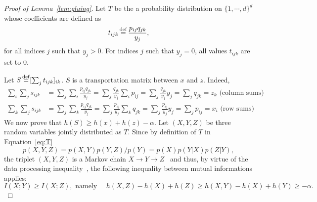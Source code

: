 \documentclass{amsart} %
\begin{document}
\begin{proof}[Proof of Lemma~\ref{lem:gluing}]
	Let $T$ be the a probability distribution on $\{1,\cdots,d\}^d$ whose coefficients are defined as 
\begin{equation}\label{eq:T}t_{ijk}\operatorname{\overset{\operatorname{def}}{=}} \frac{p_{ij}q_{jk}}{y_j},\end{equation}
	for all indices $j$ such that $y_j>0$. For indices $j$ such that $y_j=0$, all values $t_{ijk}$ are set to $0$.

Let	$S \operatorname{\overset{\operatorname{def}}{=}} [ \sum_{j} t_{ijk}]_{ik}$. $S$ is a transportation matrix between $x$ and $z$. Indeed, 
	$$\begin{aligned}
	\sum_{i} \sum_{j} s_{ijk}&= \sum_{j} \sum_{i}\frac{p_{ij}q_{jk}}{y_j}= \sum_{j} \frac{q_{jk}}{y_j} \sum_{i} p_{ij} =\sum_{j} \frac{q_{jk}}{y_j} y_j=\sum_j q_{jk}=z_k \text{  (column sums) }\\
	\sum_{k} \sum_{j} s_{ijk}&= \sum_{j} \sum_{k}\frac{p_{ij}q_{jk}}{y_j}= \sum_{j} \frac{p_{ij}}{y_j} \sum_{k}q_{jk} =\sum_{j} \frac{p_{ij}}{y_j} y_j=\sum_j p_{ij}=x_i \text{  (row sums) }
	\end{aligned}
	$$
	We now prove that $h(S)\geq h(x)+h(z)-\alpha$. Let $(X,Y,Z)$ be three random variables jointly distributed as $T$. Since by definition of $T$ in Equation~\eqref{eq:T}
	$$p(X,Y,Z)=p(X,Y)p(Y,Z)/p(Y)= p(X)p(Y|X)p(Z|Y),$$ the triplet $(X,Y,Z)$ is a Markov chain $X\rightarrow Y \rightarrow Z$~\citep[Equation 2.118]{cover91elements} and thus, by virtue of the data processing inequality~\citep[Theorem 2.8.1]{cover91elements}, the following inequality between mutual informations applies:
$$\label{eq:dpi}I(X;Y)\geq I(X;Z),\text{ namely } \quad h(X,Z)-h(X)+h(Z)\geq h(X,Y) -h(X)+h(Y)\geq -\alpha.$$\end{proof}

{\small{

}}
\end{document}
